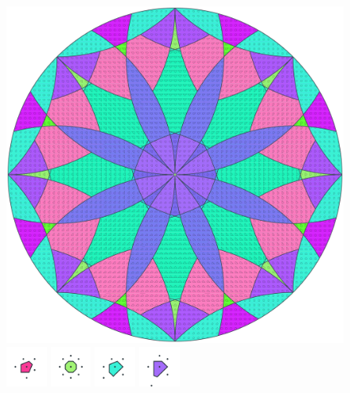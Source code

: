 \documentclass[text.tex]{subfiles}
\begin{document}
\pagestyle{fancy}
\fancyhf{}
\begin{figure}[h!]
\centering
\includegraphics[width=1\textwidth]{img/results/circle8/circle8_100000_(1_0alpha_1).pdf}
\includegraphics[width=0.12\textwidth]{img/results/circle8/circle8_100000_(1_0alpha_1)_001.pdf}
\includegraphics[width=0.12\textwidth]{img/results/circle8/circle8_100000_(1_0alpha_1)_002.pdf}
\includegraphics[width=0.12\textwidth]{img/results/circle8/circle8_100000_(1_0alpha_1)_003.pdf}
\includegraphics[width=0.12\textwidth]{img/results/circle8/circle8_100000_(1_0alpha_1)_004.pdf}

\end{figure}
\end{document}

